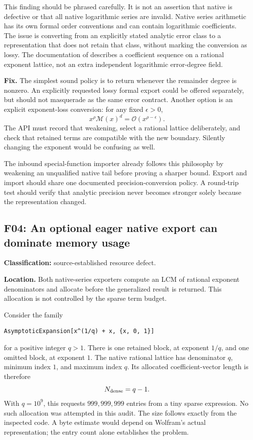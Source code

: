 \documentclass[11pt,letterpaper]{article}
\newcommand{\code}[1]{\texttt{\small\detokenize{#1}}}
\newcommand{\OO}{\mathcal O}
\newcommand{\M}{\mathcal M}
\newcommand{\finding}[3]{\Needspace{8\baselineskip}\subsection{#1: #2}\noindent\textbf{Classification:} #3.\par}
\begin{document}
This finding should be phrased carefully. It is not an assertion that native \code{SeriesData} is defective or that all native logarithmic series are invalid. Native series arithmetic has its own formal order conventions and can contain logarithmic coefficients. The issue is converting from an explicitly stated analytic error class to a representation that does not retain that class, without marking the conversion as lossy. The documentation of \code{SeriesData} describes a coefficient sequence on a rational exponent lattice, not an extra independent logarithmic error-degree field.\cite{wl-seriesdata}

\textbf{Fix.} The simplest sound policy is to return \code{Missing["LogarithmicRemainder"]} whenever the remainder degree is nonzero. An explicitly requested lossy formal export could be offered separately, but should not masquerade as the same error contract. Another option is an explicit exponent-loss conversion: for any fixed $\epsilon>0$,
\[
 x^\rho\M(x)^d=\OO(x^{\rho-\epsilon}).
\]
The API must record that weakening, select a rational lattice deliberately, and check that retained terms are compatible with the new boundary. Silently changing the exponent would be confusing as well.

The inbound special-function importer already follows this philosophy by weakening an unqualified native tail before proving a sharper bound. Export and import should share one documented precision-conversion policy. A round-trip test should verify that analytic precision never becomes stronger solely because the representation changed.\cite{repo-native}

\finding{F04}{An optional eager native export can dominate memory usage}{source-established resource defect}
\label{sec:f04}
\textbf{Location.} Both native-series exporters compute an LCM of rational exponent denominators and allocate \code{Table[0,{nmax-nmin}]} before the generalized result is returned. This allocation is not controlled by the sparse term budget.\cite{repo-core}

Consider the family
\begin{lstlisting}
AsymptoticExpansion[x^(1/q) + x, {x, 0, 1}]
\end{lstlisting}
for a positive integer $q>1$. There is one retained block, at exponent $1/q$, and one omitted block, at exponent $1$. The native rational lattice has denominator $q$, minimum index $1$, and maximum index $q$. Its allocated coefficient-vector length is therefore
\begin{equation}
 N_{\rm dense}=q-1.
\end{equation}
With $q=10^9$, this requests $999{,}999{,}999$ entries from a tiny sparse expression. No such allocation was attempted in this audit. The size follows exactly from the inspected code. A byte estimate would depend on Wolfram's actual representation; the entry count alone establishes the problem.
\end{document}
